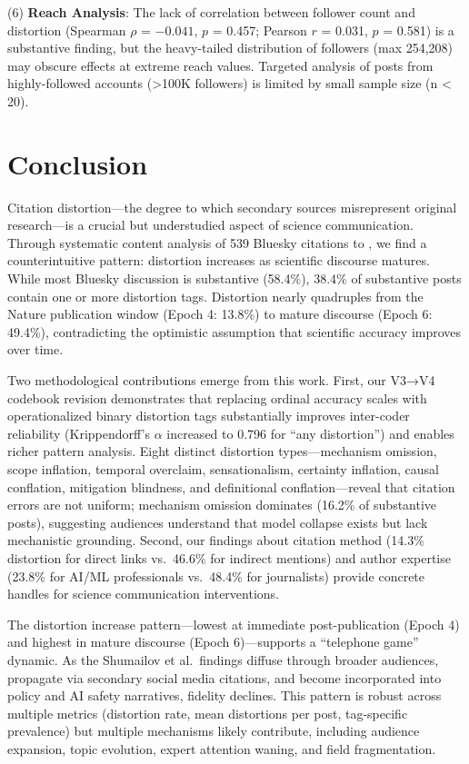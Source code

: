 \documentclass[twocolumn,11pt]{article}
\begin{document}
(6) \textbf{Reach Analysis}: The lack of correlation between follower count and distortion (Spearman $\rho$ = $-0.041$, $p$ = 0.457; Pearson $r$ = 0.031, $p$ = 0.581) is a substantive finding, but the heavy-tailed distribution of followers (max 254,208) may obscure effects at extreme reach values. Targeted analysis of posts from highly-followed accounts (>100K followers) is limited by small sample size (n < 20).

\section{Conclusion}

Citation distortion—the degree to which secondary sources misrepresent original research—is a crucial but understudied aspect of science communication. Through systematic content analysis of 539 Bluesky citations to \cite{Shumailov2024}, we find a counterintuitive pattern: distortion increases as scientific discourse matures. While most Bluesky discussion is substantive (58.4\%), 38.4\% of substantive posts contain one or more distortion tags. Distortion nearly quadruples from the Nature publication window (Epoch 4: 13.8\%) to mature discourse (Epoch 6: 49.4\%), contradicting the optimistic assumption that scientific accuracy improves over time.

Two methodological contributions emerge from this work. First, our V3→V4 codebook revision demonstrates that replacing ordinal accuracy scales with operationalized binary distortion tags substantially improves inter-coder reliability (Krippendorff's $\alpha$ increased to 0.796 for ``any distortion'') and enables richer pattern analysis. Eight distinct distortion types—mechanism omission, scope inflation, temporal overclaim, sensationalism, certainty inflation, causal conflation, mitigation blindness, and definitional conflation—reveal that citation errors are not uniform; mechanism omission dominates (16.2\% of substantive posts), suggesting audiences understand that model collapse exists but lack mechanistic grounding. Second, our findings about citation method (14.3\% distortion for direct links vs.\ 46.6\% for indirect mentions) and author expertise (23.8\% for AI/ML professionals vs.\ 48.4\% for journalists) provide concrete handles for science communication interventions.

The distortion increase pattern—lowest at immediate post-publication (Epoch 4) and highest in mature discourse (Epoch 6)—supports a ``telephone game'' dynamic. As the Shumailov et al.\ findings diffuse through broader audiences, propagate via secondary social media citations, and become incorporated into policy and AI safety narratives, fidelity declines. This pattern is robust across multiple metrics (distortion rate, mean distortions per post, tag-specific prevalence) but multiple mechanisms likely contribute, including audience expansion, topic evolution, expert attention waning, and field fragmentation.
\end{document}
